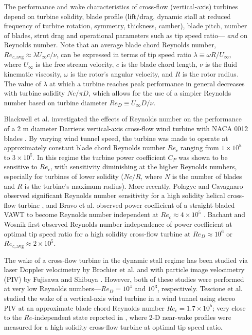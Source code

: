 \documentclass[energies,article,accept,moreauthors,pdftex,12pt,a4paper]{mdpi}
\begin{document}
The performance and wake characteristics of cross-flow (vertical-axis) turbines
depend on turbine solidity, blade profile (lift/drag, dynamic stall at reduced
frequency of turbine rotation, symmetry, thickness, camber), blade pitch, number
of blades, strut drag and operational parameters such as tip speed ratio---{\em
    and} on Reynolds number. Note that an average blade chord Reynolds number,
$Re_{c,\mathrm{avg}} \approx \lambda U_\infty c/ \nu$, can be expressed in terms
of tip speed ratio $\lambda \equiv \omega R/ U_\infty$, where $U_\infty$ is the
free stream velocity, $c$ is the blade chord length, $\nu$ is the fluid
kinematic viscosity, $\omega$ is the rotor's angular velocity, and $R$ is the
rotor radius. The value of $\lambda$ at which a turbine reaches peak performance
in general decreases with turbine solidity $Nc/\pi D$, which allows for the use
of a simpler Reynolds number based on turbine diameter $Re_D \equiv U_\infty
D/\nu$.

Blackwell et al. investigated the effects of Reynolds number on the performance
of a 2 m diameter Darrieus vertical-axis cross-flow wind turbine with NACA 0012
blades \cite{Blackwell1976}. By varying wind tunnel speed, the turbine was made
to operate at approximately constant blade chord Reynolds number $Re_c$ ranging
from $1 \times 10^5$ to $3 \times 10^5$. In this regime the turbine power
coefficient $C_P$ was shown to be sensitive to $Re_c$, with sensitivity
diminishing at the higher Reynolds numbers, especially for turbines of lower
solidity ($Nc/R$, where $N$ is the number of blades and $R$ is the turbine's
maximum radius). More recently, Polagye and Cavagnaro observed significant
Reynolds number sensitivity for a high solidity helical cross-flow turbine
\cite{Polagye2013b}, and Bravo et al. observed power coefficient of a
straight-bladed VAWT to become Reynolds number independent at $Re_c \approx 4
\times 10^5$ \cite{Bravo2007}. Bachant and Wosnik \cite{Bachant2014} first
observed Reynolds number independence of power coefficient at optimal tip speed
ratio for a high solidity cross-flow turbine at $Re_D \approx 10^6$ or
$Re_{c,\mathrm{avg}} \approx 2 \times 10^5$.

The wake of a cross-flow turbine in the dynamic stall regime has been studied
via laser Doppler velocimetry by Brochier et al. \cite{Brochier1986} and with
particle image velocimetry (PIV) by Fujisawa and Shibuya \cite{Fujisawa2001}.
However, both of these studies were performed at very low Reynolds
numbers---$Re_D = 10^4$ and $10^3$, respectively. Tescione et al.
\cite{Tescione2014} studied the wake of a vertical-axis wind turbine in a wind
tunnel using stereo PIV at an approximate blade chord Reynolds number $Re_c =
1.7 \times 10^5$; very close to the $Re$-independent state reported in
\cite{Bachant2014}, where 2-D near-wake profiles were measured for a high
solidity cross-flow turbine at optimal tip speed ratio.
\end{document}
